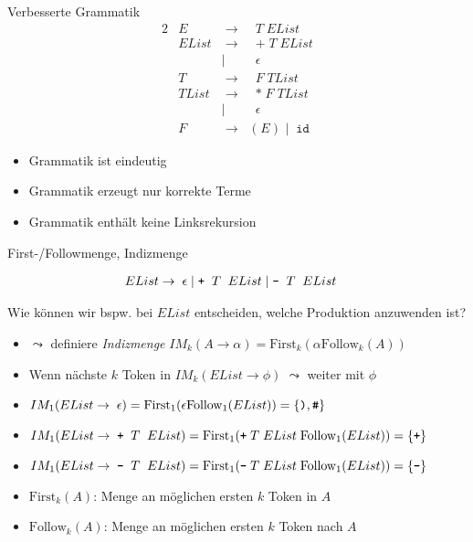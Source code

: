 \documentclass{beamer}
\begin{document}
\begin{frame}{Verbesserte Grammatik}
  \begin{alignat*}{2}
    & E      & \; \to \; & \; T \; EList \\
    & EList  & \; \to \; & \; \texttt{+} \; T \; EList \\
            && \mid \;\; & \; \epsilon \\
    & T      & \; \to \; & \; F \; TList \\
    & TList  & \; \to \; & \; \texttt{*} \; F \; TList \\
            && \mid \;\; & \; \epsilon \\
    & F      & \; \to \; & \texttt{(} \; E \; \texttt{)} \; \mid \; \texttt{id}
  \end{alignat*}

  \begin{itemize}
    \item Grammatik ist eindeutig \true
    \item Grammatik erzeugt nur korrekte Terme \true
    \item Grammatik enthält keine Linksrekursion \true
  \end{itemize}
\end{frame}

\begin{frame}{First-/Followmenge, Indizmenge}
	\footnotesize

	\begin{align*}
		EList \to & \;\; \epsilon \mid \textrm{\texttt{+}} \;\; T \;\; EList \mid \textrm{\texttt{-}} \;\; T \;\; EList
	\end{align*}
	
	Wie können wir bspw. bei $EList$ entscheiden, welche Produktion anzuwenden ist?
	\pause
	\begin{itemize}
		\item $\leadsto$ definiere \emph{Indizmenge} $IM_k(A \to \alpha) = \textrm{First}_k(\alpha \textrm{Follow}_k(A))$
		\item Wenn nächste $k$ Token in $IM_k(EList \to \phi)$ $\leadsto$ weiter mit $\phi$
		\pause
		\item $IM_1(EList \to \; \epsilon) = \textrm{First}_1(\epsilon \textrm{Follow}_1(EList)) = \{ \textrm{\texttt{)}}, \textrm{\texttt{\#}} \}$
		\item $IM_1(EList \to \; \textrm{\texttt{+}} \;\; T \;\; EList) = \textrm{First}_1(\textrm{\texttt{+}} \; T \; EList \; \textrm{Follow}_1(EList)) = \{ \textrm{\texttt{+}} \}$
		\item $IM_1(EList \to \; \textrm{\texttt{-}} \;\; T \;\; EList) = \textrm{First}_1(\textrm{\texttt{-}} \; T \; EList \; \textrm{Follow}_1(EList)) = \{ \textrm{\texttt{-}} \}$
		\pause
		\item $\textrm{First}_k(A)$: Menge an möglichen ersten $k$ Token in $A$
		\item $\textrm{Follow}_k(A)$: Menge an möglichen ersten $k$ Token nach $A$
	\end{itemize}
\end{frame}
\end{document}
